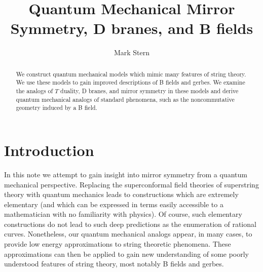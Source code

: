 \documentclass[a4paper,11pt]{amsart}
\title{Quantum Mechanical Mirror Symmetry, D branes, and B fields}
\author{Mark Stern}
\date{}
\begin{document}
\begin{abstract} We construct quantum mechanical models which mimic many
features of string theory. We use these models to gain improved descriptions of
B fields and gerbes. We examine the analogs of $T$ duality, D branes, and mirror
symmetry in these models and derive quantum mechanical analogs of standard
 phenomena, such as the noncommutative geometry induced by a B field.
 \end{abstract} 
 \maketitle
\section{Introduction}
In this note we attempt to gain insight into mirror symmetry from a quantum
mechanical perspective. Replacing the superconformal field theories 
of superstring theory with quantum mechanics leads to constructions which are 
extremely elementary (and which can be expressed in terms easily accessible to
 a mathematician with no familiarity with physics). Of course, such elementary 
 constructions do not lead to such deep predictions as the enumeration
of rational curves. Nonetheless,  our quantum mechanical analogs 
appear, in many cases, to provide low energy approximations to string theoretic
phenomena. These approximations can then be applied to gain new understanding 
of some poorly understood features of string theory, most notably B fields and 
gerbes.
\end{document}
